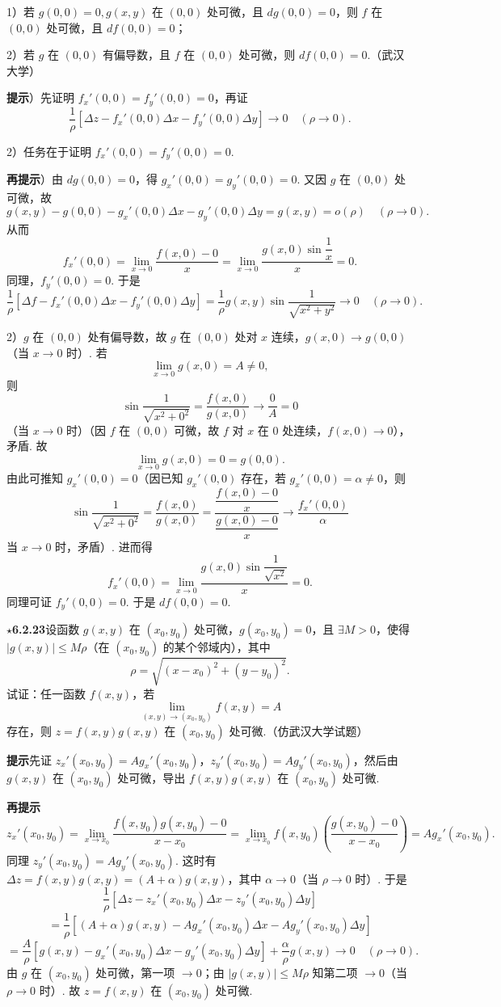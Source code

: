 \documentclass[UTF8,12pt,a4paper,fontset=fandol]{ctexart}
\begin{document}
1）若 $g(0,0)=0,g(x,y)$ 在 $(0,0)$ 处可微，且 $dg(0,0)=0$，则 $f$ 在 $(0,0)$ 处可微，且 $df(0,0)=0$；

2）若 $g$ 在 $(0,0)$ 有偏导数，且 $f$ 在 $(0,0)$ 处可微，则 $df(0,0)=0$.（武汉大学）

\noindent\textbf{提示}）先证明 $f_x'(0,0)=f_y'(0,0)=0$，再证
\[
  \frac1\rho[\Delta z-f_x'(0,0)\Delta x-f_y'(0,0)\Delta y]\to0\quad(\rho\to0).
\]

2）任务在于证明 $f_x'(0,0)=f_y'(0,0)=0$.

\noindent\textbf{再提示}）由 $dg(0,0)=0$，得 $g_x'(0,0)=g_y'(0,0)=0$. 又因 $g$ 在 $(0,0)$ 处可微，故
\[
  g(x,y)-g(0,0)-g_x'(0,0)\Delta x-g_y'(0,0)\Delta y=g(x,y)=o(\rho)\quad(\rho\to0).
\]
从而
\[
  f_x'(0,0)=\lim_{x\to0}\frac{f(x,0)-0}{x}
  =\lim_{x\to0}\frac{g(x,0)\sin\dfrac1x}{x}=0.
\]
同理，$f_y'(0,0)=0$. 于是
\[
  \frac1\rho[\Delta f-f_x'(0,0)\Delta x-f_y'(0,0)\Delta y]
  =\frac1\rho g(x,y)\sin\frac1{\sqrt{x^2+y^2}}\to0\quad(\rho\to0).
\]

2）$g$ 在 $(0,0)$ 处有偏导数，故 $g$ 在 $(0,0)$ 处对 $x$ 连续，$g(x,0)\to g(0,0)$（当 $x\to0$ 时）. 若
\[
  \lim_{x\to0}g(x,0)=A\ne0,
\]
则
\[
  \sin\frac1{\sqrt{x^2+0^2}}=\frac{f(x,0)}{g(x,0)}\to\frac0A=0
\]
（当 $x\to0$ 时）（因 $f$ 在 $(0,0)$ 可微，故 $f$ 对 $x$ 在 $0$ 处连续，$f(x,0)\to0$），矛盾. 故
\[
  \lim_{x\to0}g(x,0)=0=g(0,0).
\]
由此可推知 $g_x'(0,0)=0$（因已知 $g_x'(0,0)$ 存在，若 $g_x'(0,0)=\alpha\ne0$，则
\[
  \sin\frac1{\sqrt{x^2+0^2}}
  =\frac{f(x,0)}{g(x,0)}
  =\frac{\dfrac{f(x,0)-0}{x}}{\dfrac{g(x,0)-0}{x}}\to\frac{f_x'(0,0)}{\alpha}
\]
当 $x\to0$ 时，矛盾）. 进而得
\[
  f_x'(0,0)=\lim_{x\to0}\frac{g(x,0)\sin\dfrac1{\sqrt{x^2}}}{x}=0.
\]
同理可证 $f_y'(0,0)=0$. 于是 $df(0,0)=0$.

\noindent\textbf{\ensuremath{\star}6.2.23}\quad 设函数 $g(x,y)$ 在 $(x_0,y_0)$ 处可微，$g(x_0,y_0)=0$，且 $\exists M>0$，使得 $|g(x,y)|\le M\rho$（在 $(x_0,y_0)$ 的某个邻域内），其中
\[
  \rho=\sqrt{(x-x_0)^2+(y-y_0)^2}.
\]
试证：任一函数 $f(x,y)$，若
\[
  \lim_{(x,y)\to(x_0,y_0)}f(x,y)=A
\]
存在，则 $z=f(x,y)g(x,y)$ 在 $(x_0,y_0)$ 处可微.（仿武汉大学试题）

\noindent\textbf{提示}\quad 先证 $z_x'(x_0,y_0)=Ag_x'(x_0,y_0)$，$z_y'(x_0,y_0)=Ag_y'(x_0,y_0)$，然后由 $g(x,y)$ 在 $(x_0,y_0)$ 处可微，导出 $f(x,y)g(x,y)$ 在 $(x_0,y_0)$ 处可微.

\noindent\textbf{再提示}\quad
\[
  z_x'(x_0,y_0)=\lim_{x\to x_0}
  \frac{f(x,y_0)g(x,y_0)-0}{x-x_0}
  =\lim_{x\to x_0}f(x,y_0)
  \left(\frac{g(x,y_0)-0}{x-x_0}\right)
  =Ag_x'(x_0,y_0).
\]
同理 $z_y'(x_0,y_0)=Ag_y'(x_0,y_0)$. 这时有 $\Delta z=f(x,y)g(x,y)=(A+\alpha)g(x,y)$，其中 $\alpha\to0$（当 $\rho\to0$ 时）. 于是
\[
  \frac1\rho[\Delta z-z_x'(x_0,y_0)\Delta x-z_y'(x_0,y_0)\Delta y]
\]
\[
  =\frac1\rho[(A+\alpha)g(x,y)-Ag_x'(x_0,y_0)\Delta x-Ag_y'(x_0,y_0)\Delta y]
\]
\[
  =\frac A\rho[g(x,y)-g_x'(x_0,y_0)\Delta x-g_y'(x_0,y_0)\Delta y]
  +\frac\alpha\rho g(x,y)\to0\quad(\rho\to0).
\]
由 $g$ 在 $(x_0,y_0)$ 处可微，第一项 $\to0$；由 $|g(x,y)|\le M\rho$ 知第二项 $\to0$（当 $\rho\to0$ 时）. 故 $z=f(x,y)$ 在 $(x_0,y_0)$ 处可微.
\end{document}

